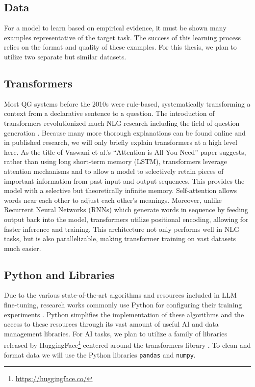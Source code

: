\subsection{Data}
For a model to learn based on empirical evidence, it must be shown many examples representative of the target task. The success of this learning process relies on the format and quality of these examples. For this thesis, we plan to utilize two separate but similar datasets.

\subsection{Transformers}
Most QG systems before the 2010s were rule-based, systematically transforming a context from a declarative sentence to a question. The introduction of transformers revolutionized much NLG research including the field of question generation \cite{vaswani2017}. Because many more thorough explanations can be found online and in published research, we will only briefly explain transformers at a high level here. As the title of Vaswani et al.'s ``Attention is All You Need'' paper suggests, rather than using long short-term memory (LSTM), transformers leverage attention mechanisms and to allow a model to selectively retain pieces of important information from past input and output sequences. This provides the model with a selective but theoretically infinite memory. Self-attention allows words near each other to adjust each other's meanings. Moreover, unlike Recurrent Neural Networks (RNNs) which generate words in sequence by feeding output back into the model, transformers utilize positional encoding, allowing for faster inference and training. This architecture not only performs well in NLG tasks, but is also parallelizable, making transformer training on vast datasets much easier.

\subsection{Python and Libraries}
Due to the various state-of-the-art algorithms and resources included in LLM fine-tuning, research works commonly use Python for configuring their training experiments \cite{serban2016, kumar2021, ushio2022, goyal2023, ushio2023, hwang2023}. Python simplifies the implementation of these algorithms and the access to these resources through its vast amount of useful AI and data management libraries. For AI tasks, we plan to utilize a family of libraries released by HuggingFace\footnote{\url{https://huggingface.co/}} centered around the transformers library \cite{wolf2020}. To clean and format data we will use the Python libraries \lstinline{pandas} and \lstinline{numpy}.
